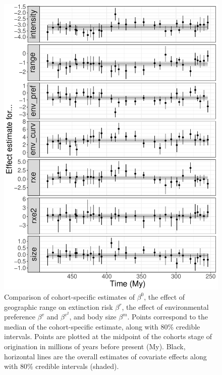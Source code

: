 \documentclass{article}
\begin{document}
\begin{figure}[ht]
  \centering
  \includegraphics[width = \textwidth,height = 0.8\textheight,keepaspectratio=true]{figure/cohort_series}
  \caption{Comparison of cohort-specific estimates of \(\beta^{0}\), the effect of geographic range on extinction risk \(\beta^{r}\), the effect of environmental preference \(\beta^{v}\) and \(\beta^{v^{2}}\), and body size \(\beta^{m}\). Points correspond to the median of the cohort-specific estimate, along with 80\% credible intervals. Points are plotted at the midpoint of the cohorts stage of origination in millions of years before present (My). Black, horizontal lines are the overall estimates of covariate effects along with 80\% credible intervals (shaded).}
  \label{fig:cohort_series}
\end{figure}
\end{document}
